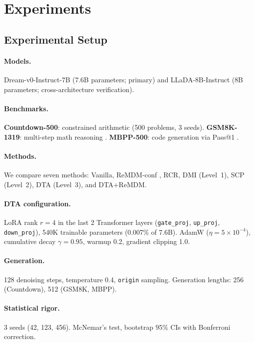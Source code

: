 \documentclass{article}
\begin{document}
\section{Experiments}
\label{sec:experiments}

\subsection{Experimental Setup}
\label{sec:setup}

\paragraph{Models.} Dream-v0-Instruct-7B (7.6B parameters; primary) and LLaDA-8B-Instruct (8B parameters; cross-architecture verification).

\paragraph{Benchmarks.}
\textbf{Countdown-500}: constrained arithmetic (500 problems, 3 seeds).
\textbf{GSM8K-1319}: multi-step math reasoning \citep{cobbe2021gsm8k}.
\textbf{MBPP-500}: code generation via Pass@1 \citep{austin2021mbpp}.

\paragraph{Methods.} We compare seven methods: Vanilla, ReMDM-conf \citep{arriola2025remdm}, RCR, DMI (Level~1), SCP (Level~2), DTA (Level~3), and DTA+ReMDM.

\paragraph{DTA configuration.} LoRA rank $r = 4$ in the last 2 Transformer layers (\texttt{gate\_proj}, \texttt{up\_proj}, \texttt{down\_proj}), 540K trainable parameters (0.007\% of 7.6B). AdamW ($\eta = 5 \times 10^{-4}$), cumulative decay $\gamma = 0.95$, warmup 0.2, gradient clipping 1.0.

\paragraph{Generation.} 128 denoising steps, temperature 0.4, \texttt{origin} sampling. Generation lengths: 256 (Countdown), 512 (GSM8K, MBPP).

\paragraph{Statistical rigor.} 3 seeds (42, 123, 456). McNemar's test, bootstrap 95\% CIs with Bonferroni correction.
\end{document}
